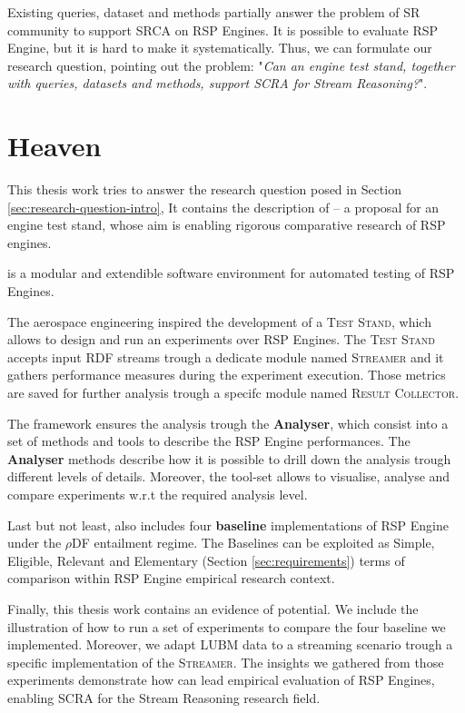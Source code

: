 Existing queries, dataset and methods partially answer the problem of SR community to support SRCA on RSP Engines. It is possible to evaluate RSP Engine, but it is hard to make it systematically. Thus, we can formulate our research question, pointing out the problem: "\textit{Can an engine test stand, together with queries, datasets and methods, support SCRA for Stream Reasoning?}".

\section{Heaven}\label{sec:heaven-intro}

This thesis work tries to answer the research question posed in Section \ref{sec:research-question-intro}, It contains the description of \name -- a proposal for an engine test stand,  whose aim is enabling rigorous comparative research of RSP engines. 

\name is a modular and extendible software environment for automated testing of RSP Engines. 

The aerospace engineering inspired the development of a \textsc{Test Stand}, which allows to design and run an experiments over RSP Engines. The \textsc{Test Stand} accepts input RDF streams trough a dedicate module named \textsc{Streamer} and it gathers performance measures during the experiment execution. Those metrics are saved for further analysis trough a specifc module named \textsc{Result Collector}.

The framework ensures the analysis trough the \textbf{Analyser}, which consist into a set of methods and tools to describe the RSP Engine performances. The \textbf{Analyser} methods describe how it is possible to drill down the analysis trough different levels of details. Moreover, the tool-set allows to visualise, analyse and compare experiments w.r.t the required analysis level. 

Last but not least, \name also includes four \textbf{baseline} implementations of RSP Engine under the $\rho$DF \cite{DBLP:conf/esws/MunozPG07} entailment regime. The Baselines can be exploited  as Simple, Eligible, Relevant and Elementary (Section \ref{sec:requirements}) terms of comparison within RSP Engine empirical research context.  

Finally, this thesis work contains an evidence of \name potential. We include the illustration of how to run a set of experiments to compare the four baseline we implemented. Moreover, we adapt LUBM data to a streaming scenario trough a specific implementation of the \textsc{Streamer}. The insights we gathered from those experiments demonstrate how \name can lead empirical evaluation of RSP Engines, enabling SCRA for the Stream Reasoning research field.

